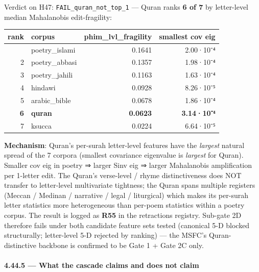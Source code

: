 \documentclass[
]{article}
\newcounter{none} %
\begin{document}
Verdict on H47: \texttt{FAIL\_quran\_not\_top\_1} --- Quran ranks
\textbf{6 of 7} by letter-level median Mahalanobis edit-fragility:

{\def\LTcaptype{none} %
\begin{longtable}[]{@{}rlrr@{}}
\toprule\noalign{}
rank & corpus & phim\_lvl\_fragility & smallest cov eig \\
\midrule\noalign{}
\endhead
\bottomrule\noalign{}
\endlastfoot
1 & poetry\_islami & 0.1641 & 2.00·10⁻⁴ \\
2 & poetry\_abbasi & 0.1357 & 1.98·10⁻⁴ \\
3 & poetry\_jahili & 0.1163 & 1.63·10⁻⁴ \\
4 & hindawi & 0.0928 & 8.26·10⁻⁵ \\
5 & arabic\_bible & 0.0678 & 1.86·10⁻⁴ \\
\textbf{6} & \textbf{quran} & \textbf{0.0623} & \textbf{3.14·10⁻⁴} \\
7 & ksucca & 0.0224 & 6.64·10⁻⁵ \\
\end{longtable}
}

\textbf{Mechanism}: Quran's per-surah letter-level features have the
\emph{largest} natural spread of the 7 corpora (smallest covariance
eigenvalue is \emph{largest} for Quran). Smaller cov eig in poetry ⇒
larger Sinv eig ⇒ larger Mahalanobis amplification per 1-letter edit.
The Quran's verse-level / rhyme distinctiveness does NOT transfer to
letter-level multivariate tightness; the Quran spans multiple registers
(Meccan / Medinan / narrative / legal / liturgical) which makes its
per-surah letter statistics more heterogeneous than per-poem statistics
within a poetry corpus. The result is logged as \textbf{R55} in the
retractions registry. Sub-gate 2D therefore fails under both candidate
feature sets tested (canonical 5-D blocked structurally; letter-level
5-D rejected by ranking) --- the MSFC's Quran-distinctive backbone is
confirmed to be Gate 1 + Gate 2C only.

\paragraph{4.44.5 --- What the cascade claims and does not
claim}\label{what-the-cascade-claims-and-does-not-claim}
\end{document}
